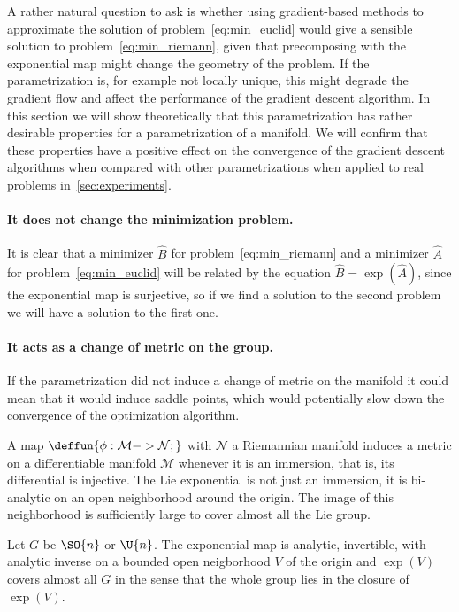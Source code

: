 A rather natural question to ask is whether using gradient-based methods to approximate the solution of problem~\eqref{eq:min_euclid} would give a sensible solution to problem~\eqref{eq:min_riemann}, given that precomposing with the exponential map might change the geometry of the problem. If the parametrization is, for example not locally unique, this might degrade the gradient flow and affect the performance of the gradient descent algorithm. In this section we will show theoretically that this parametrization has rather desirable properties for a parametrization of a manifold. We will confirm that these properties have a positive effect on the convergence of the gradient descent algorithms when compared with other parametrizations when applied to real problems in~\ref{sec:experiments}.

\paragraph{It does not change the minimization problem.} It is clear that a minimizer $\widehat{B}$ for problem~\eqref{eq:min_riemann} and a minimizer $\widehat{A}$ for problem~\eqref{eq:min_euclid} will be related by the equation $\widehat{B} = \exp(\widehat{A})$, since the exponential map is surjective, so if we find a solution to the second problem we will have a solution to the first one.

\paragraph{It acts as a change of metric on the group.} If the parametrization did not induce a change of metric on the manifold it could mean that it would induce saddle points, which would potentially slow down the convergence of the optimization algorithm.

A map $\deffun{\phi : \mathcal{M} -> \mathcal{N};}$ with $\mathcal{N}$ a Riemannian manifold induces a metric on a differentiable manifold $\mathcal{M}$ whenever it is an immersion, that is, its differential is injective. The Lie exponential is not just an immersion, it is bi-analytic on an open neighborhood around the origin. The image of this neighborhood is sufficiently large to cover almost all the Lie group.

\begin{proposition}\label{prop:bianalytic}
    Let $G$ be $\SO{n}$ or $\U{n}$. The exponential map is analytic, invertible, with analytic inverse on a bounded open neigborhood $V$ of the origin and $\exp(V)$ covers almost all $G$ in the sense that the whole group lies in the closure of $\exp(V)$.
\end{proposition}

